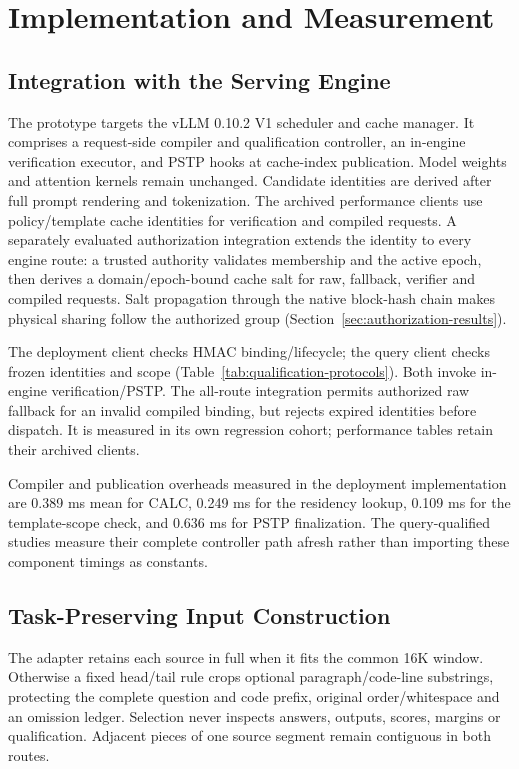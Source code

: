 \section{Implementation and Measurement}
\label{sec:implementation}

\subsection{Integration with the Serving Engine}
The prototype targets the vLLM 0.10.2 V1 scheduler and cache manager. It comprises a request-side compiler and qualification controller, an in-engine verification executor, and PSTP hooks at cache-index publication. Model weights and attention kernels remain unchanged. Candidate identities are derived after full prompt rendering and tokenization. The archived performance clients use policy/template cache identities for verification and compiled requests. A separately evaluated authorization integration extends the identity to every engine route: a trusted authority validates membership and the active epoch, then derives a domain/epoch-bound cache salt for raw, fallback, verifier and compiled requests. Salt propagation through the native block-hash chain makes physical sharing follow the authorized group (Section~\ref{sec:authorization-results}).

The deployment client checks HMAC binding/lifecycle; the query client checks frozen identities and scope (Table~\ref{tab:qualification-protocols}). Both invoke in-engine verification/PSTP. The all-route integration permits authorized raw fallback for an invalid compiled binding, but rejects expired identities before dispatch. It is measured in its own regression cohort; performance tables retain their archived clients.

Compiler and publication overheads measured in the deployment implementation are 0.389 ms mean for CALC, 0.249 ms for the residency lookup, 0.109 ms for the template-scope check, and 0.636 ms for PSTP finalization. The query-qualified studies measure their complete controller path afresh rather than importing these component timings as constants.

\subsection{Task-Preserving Input Construction}
The adapter retains each source in full when it fits the common 16K window. Otherwise a fixed head/tail rule crops optional paragraph/code-line substrings, protecting the complete question and code prefix, original order/whitespace and an omission ledger. Selection never inspects answers, outputs, scores, margins or qualification. Adjacent pieces of one source segment remain contiguous in both routes.

